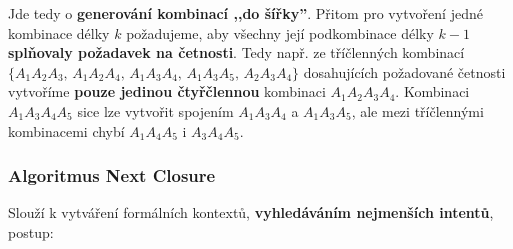 Jde tedy o \textbf{generování kombinací ,,do šířky''}. Přitom pro vytvoření jedné kombinace délky $ k $ požadujeme, aby všechny její podkombinace délky $ k-1 $ \textbf{splňovaly požadavek na četnosti}. Tedy např. ze tříčlenných kombinací $\{A_1A_2A_3,  \,A_1A_2A_4, \, A_1A_3A_4, \,A_1A_3A_5,  \,A_2A_3A_4\}$ dosahujících požadované četnosti vytvoříme \textbf{pouze jedinou čtyřčlennou} kombinaci $ A_1A_2A_3A_4 $. Kombinaci $ A_1A_3A_4A_5 $ sice lze vytvořit spojením $ A_1A_3A_4 $ a
$ A_1A_3A_5 $, ale mezi tříčlennými kombinacemi chybí $ A_1A_4A_5 $ i $ A_3A_4A_5 $.

\subsubsection{Algoritmus Next Closure}
Slouží k vytváření formálních kontextů, \textbf{vyhledáváním nejmenších intentů}, postup:

